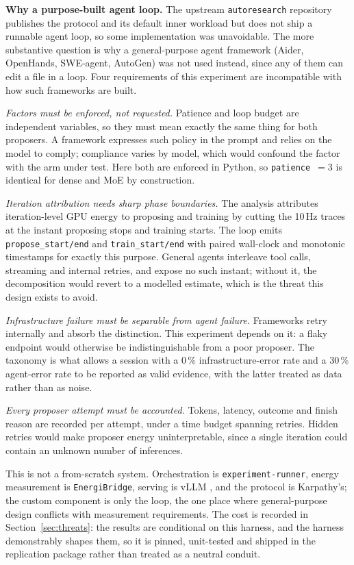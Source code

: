 \textbf{Why a purpose-built agent loop.} The upstream \texttt{autoresearch}
repository publishes the protocol and its default inner workload but does not
ship a runnable agent loop, so some implementation was unavoidable. The more
substantive question is why a general-purpose agent framework (Aider, OpenHands,
SWE-agent, AutoGen) was not used instead, since any of them can edit a file in a
loop. Four requirements of this experiment are incompatible with how such
frameworks are built.

\emph{Factors must be enforced, not requested.} Patience and loop budget are
independent variables, so they must mean exactly the same thing for both
proposers. A framework expresses such policy in the prompt and relies on the
model to comply; compliance varies by model, which would confound the factor with
the arm under test. Here both are enforced in Python, so \texttt{patience}~$=3$ is
identical for dense and MoE by construction.

\emph{Iteration attribution needs sharp phase boundaries.} The analysis attributes
iteration-level GPU energy to proposing and training by cutting the 10\,Hz traces
at the instant proposing stops and training starts. The loop
emits \texttt{propose\_start/end} and \texttt{train\_start/end} with paired
wall-clock and monotonic timestamps for exactly this purpose. General agents
interleave tool calls, streaming and internal retries, and expose no such
instant; without it, the decomposition would revert to a modelled estimate, which
is the threat this design exists to avoid.

\emph{Infrastructure failure must be separable from agent failure.} Frameworks
retry internally and absorb the distinction. This experiment depends on it: a
flaky endpoint would otherwise be indistinguishable from a poor proposer. The
taxonomy is what allows a session with a 0\,\% infrastructure-error rate and a
30\,\% agent-error rate to be reported as valid evidence, with the latter treated
as data rather than as noise.

\emph{Every proposer attempt must be accounted.} Tokens, latency, outcome and
finish reason are recorded per attempt, under a time budget spanning retries.
Hidden retries would make proposer energy uninterpretable, since a single
iteration could contain an unknown number of inferences.

This is not a from-scratch system. Orchestration is \texttt{experiment-runner},
energy measurement is \texttt{EnergiBridge}, serving is vLLM \cite{kwon2023vllm}, and the protocol is
Karpathy's; the custom component is only the loop, the one place where
general-purpose design conflicts with measurement requirements. The cost is
recorded in Section~\ref{sec:threats}: the results are conditional on this
harness, and the harness demonstrably shapes them, so it is pinned, unit-tested
and shipped in the replication package rather than treated as a neutral conduit.

